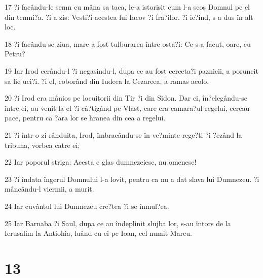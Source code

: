 \par 17 ?i facându-le semn cu mâna sa taca, le-a istorisit cum l-a scos Domnul pe el din temni?a. ?i a zis: Vesti?i acestea lui Iacov ?i fra?ilor. ?i ie?ind, s-a dus în alt loc.
\par 18 ?i facându-se ziua, mare a fost tulburarea între osta?i: Ce s-a facut, oare, cu Petru?
\par 19 Iar Irod cerându-l ?i negasindu-l, dupa ce au fost cerceta?i paznicii, a poruncit sa fie uci?i. ?i el, coborând din Iudeea la Cezareea, a ramas acolo.
\par 20 ?i Irod era mânios pe locuitorii din Tir ?i din Sidon. Dar ei, în?elegându-se între ei, au venit la el ?i câ?tigând pe Vlast, care era camara?ul regelui, cereau pace, pentru ca ?ara lor se hranea din cea a regelui.
\par 21 ?i într-o zi rânduita, Irod, îmbracându-se în ve?minte rege?ti ?i ?ezând la tribuna, vorbea catre ei;
\par 22 Iar poporul striga: Acesta e glas dumnezeiesc, nu omenesc!
\par 23 ?i îndata îngerul Domnului l-a lovit, pentru ca nu a dat slava lui Dumnezeu. ?i mâncându-l viermii, a murit.
\par 24 Iar cuvântul lui Dumnezeu cre?tea ?i se înmul?ea.
\par 25 Iar Barnaba ?i Saul, dupa ce au îndeplinit slujba lor, s-au întors de la Ierusalim la Antiohia, luând cu ei pe Ioan, cel numit Marcu.

\chapter{13}

